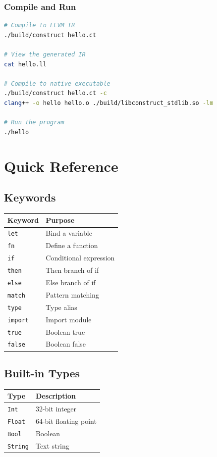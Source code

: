 \documentclass[11pt,twoside,openright]{book}
\begin{document}
\subsection{Compile and Run}

\begin{lstlisting}[language=bash]
# Compile to LLVM IR
./build/construct hello.ct

# View the generated IR
cat hello.ll

# Compile to native executable
./build/construct hello.ct -c
clang++ -o hello hello.o ./build/libconstruct_stdlib.so -lm

# Run the program
./hello
\end{lstlisting}

\chapter{Quick Reference}

\section{Keywords}

\begin{center}
\begin{tabular}{|l|l|}
\hline
\textbf{Keyword} & \textbf{Purpose} \\
\hline
\texttt{let} & Bind a variable \\
\texttt{fn} & Define a function \\
\texttt{if} & Conditional expression \\
\texttt{then} & Then branch of if \\
\texttt{else} & Else branch of if \\
\texttt{match} & Pattern matching \\
\texttt{type} & Type alias \\
\texttt{import} & Import module \\
\texttt{true} & Boolean true \\
\texttt{false} & Boolean false \\
\hline
\end{tabular}
\end{center}

\section{Built-in Types}

\begin{center}
\begin{tabular}{|l|l|}
\hline
\textbf{Type} & \textbf{Description} \\
\hline
\texttt{Int} & 32-bit integer \\
\texttt{Float} & 64-bit floating point \\
\texttt{Bool} & Boolean \\
\texttt{String} & Text string \\
\hline
\end{tabular}
\end{center}
\end{document}
